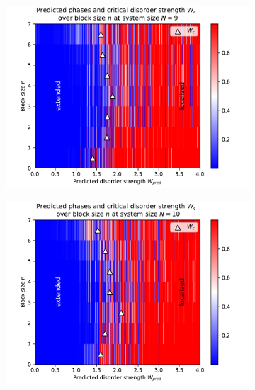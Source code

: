 \documentclass[reprint,amsmath,amssymb,aps,prb]{revtex4-2}
\begin{document}
\onecolumngrid
\begin{center}
	\begin{figure}[H]
		\centering	
		\begin{subfigure}[c]{0.45\textwidth}
			\includegraphics[width=\textwidth]{../results/Wc/N9_Wc_n_dependency.pdf}
		\end{subfigure}
		\begin{subfigure}[c]{0.45\textwidth}
			\includegraphics[width=\textwidth]{../results/Wc/N10_Wc_n_dependency.pdf}
		\end{subfigure}
		\begin{subfigure}[c]{0.45\textwidth}

\end{subfigure}
\end{figure}
\end{center}
\end{document}
